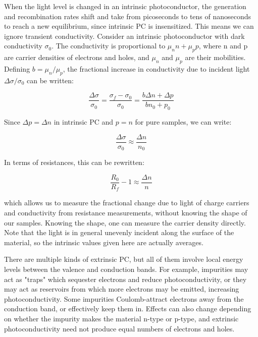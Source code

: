\documentclass{article}
\begin{document}
When the light level is changed in an intrinsic photoconductor, the generation and recombination rates shift and take from picoseconds to tens of nanoseconds to reach a new equilibrium, since intrinsic PC is insensitized. This means we can ignore transient conductivity. Consider an intrinsic photoconductor with dark conductivity $\sigma_0$. The conductivity is proportional to $\mu_nn+\mu_pp$, where n and p are carrier densities of electrons and holes, and $\mu_n$ and $\mu_p$ are their mobilities. Defining $b=\mu_n/\mu_p$, the fractional increase in conductivity due to incident light $\Delta \sigma/\sigma_0$ can be written:

\begin{equation}
    \frac{\Delta \sigma}{\sigma_0} = \frac{\sigma_f-\sigma_0}{\sigma_0} = \frac{b\Delta n+\Delta p}{bn_0+p_0}
\end{equation}

Since $\Delta p = \Delta n$ in intrinsic PC and $p=n$ for pure samples, we can write:

\begin{equation}
    \frac{\Delta \sigma}{\sigma_0} \approx \frac{\Delta n}{n_0}
\end{equation}

In terms of resistances, this can be rewritten:

\begin{equation}
    \frac{R_0}{R_f}-1\approx\frac{\Delta n}{n}
\end{equation}

which allows us to measure the fractional change due to light of charge carriers and conductivity from resistance measurements, without knowing the shape of our samples. Knowing the shape, one can measure the carrier density directly. Note that the light is in general unevenly incident along the surface of the material, so the intrinsic values given here are actually averages.

There are multiple kinds of extrinsic PC, but all of them involve local energy levels between the valence and conduction bands. For example, impurities may act as "traps" which sequester electrons and reduce photoconductivity, or they may act as reservoirs from which more electrons may be emitted, increasing photoconductivity. Some impurities Coulomb-attract electrons away from the conduction band, or effectively keep them in. Effects can also change depending on whether the impurity makes the material n-type or p-type, and extrinsic photoconductivity need not produce equal numbers of electrons and holes.
\end{document}
